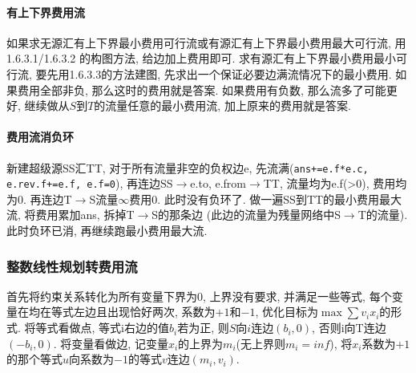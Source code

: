 \paragraph{有上下界费用流}
如果求无源汇有上下界最小费用可行流或有源汇有上下界最小费用最大可行流, 用1.6.3.1/1.6.3.2 的构图方法, 给边加上费用即可. 
求有源汇有上下界最小费用最小可行流, 要先用1.6.3.3的方法建图, 先求出一个保证必要边满流情况下的最小费用. 如果费用全部非负, 那么这时的费用就是答案. 如果费用有负数, 那么流多了可能更好, 继续做从$S$到$T$的流量任意的最小费用流, 加上原来的费用就是答案. 
\paragraph{费用流消负环}
新建超级源SS汇TT, 对于所有流量非空的负权边e, 先流满(\texttt{ans+=e.f*e.c, e.rev.f+=e.f, e.f=0}), 再连边SS$\to$e.to, e.from$\to$TT, 流量均为e.f(>0), 费用均为0. 再连边T$\to$S流量$\infty$费用0. 此时没有负环了. 做一遍SS到TT的最小费用最大流, 将费用累加ans, 拆掉T$\to$S的那条边 (此边的流量为残量网络中S$\to$T的流量). 此时负环已消, 再继续跑最小费用最大流.
\begin{comment}
\subsubsection*{二分图最小点覆盖和最大独立集}
\noindent
最小点覆盖: 求出一个最大匹配, 从左部开始每次寻找一个未匹配点, 从该点出发可以得到``未匹配-匹配-未匹配..."形式的交错树, 标记所有这些点. 则最小点覆盖方案为右部未标记点与左部标记点的并集. 显然最小点覆盖集合大小 = 最大匹配.\\
最大独立集 = 全集 - 最小点覆盖.
\end{comment}
\subsubsection*{整数线性规划转费用流}
\noindent
首先将约束关系转化为所有变量下界为$0$, 上界没有要求, 并满足一些等式,
每个变量在均在等式左边且出现恰好两次, 系数为$+1$和$-1$, 优化目标为$\max\sum v_ix_i$的形式.
将等式看做点, 等式i右边的值$b_i$若为正, 则$S$向$i$连边$(b_i, 0)$, 否则i向T连边$(-b_i, 0)$.
将变量看做边, 记变量$x_i$的上界为$m_i$(无上界则$m_i=inf$), 将$x_i$系数为$+1$的那个等式$u$向系数为$-1$的等式$v$连边$(m_i, v_i)$.